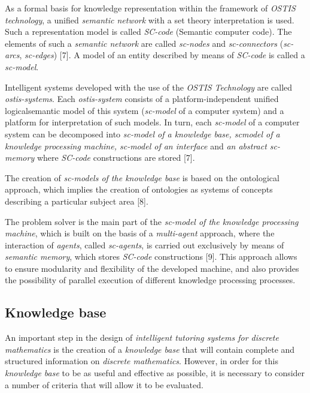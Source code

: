 \documentclass[twocolumn]{scndocument}
\begin{document}
As a formal basis for knowledge representation within the framework of \textit{OSTIS technology}, a unified \textit{semantic network} with a set theory interpretation is used. Such a representation model is called \textit{SC-code} (Semantic computer code). The elements of such a \textit{semantic network} are called \textit{sc-nodes} and \textit{sc-connectors} (\textit{sc-arcs}, \textit{sc-edges}) [7]. A model of an entity described by means of \textit{SC-code} is called a \textit{sc-model}.

Intelligent systems developed with the use of the \textit{OSTIS Technology} are called \textit{ostis-systems}. Each \textit{ostis-system} consists of a platform-independent unified logicalsemantic model of this system (\textit{sc-model} of a computer system) and a platform for interpretation of such models. In turn, each \textit{sc-model} of a computer system can be decomposed into \textit{sc-model of a knowledge base, scmodel of a knowledge processing machine, sc-model of an interface} and \textit{an abstract sc-memory} where \textit{SC-code} constructions are stored [7].

The creation of \textit{sc-models of the knowledge base} is based on the ontological approach, which implies the creation of ontologies as systems of concepts describing a particular subject area [8].

The problem solver is the main part of the \textit{sc-model of the knowledge processing machine}, which is built on the basis of a \textit{multi-agent} approach, where the interaction of \textit{agents}, called \textit{sc-agents}, is carried out exclusively by means of \textit{semantic memory}, which stores \textit{SC-code} constructions [9]. This approach allows to ensure modularity and flexibility of the developed machine, and also provides the possibility of parallel execution of different knowledge processing processes.

\begin{center}
    \section{Knowledge base}
\end{center}

An important step in the design of \textit{intelligent tutoring systems for discrete mathematics} is the creation of a \textit{knowledge base} that will contain complete and structured information on \textit{discrete mathematics}. However, in order for this \textit{knowledge base} to be as useful and effective as possible, it is necessary to consider a number of criteria that will allow it to be evaluated.
\end{document}
